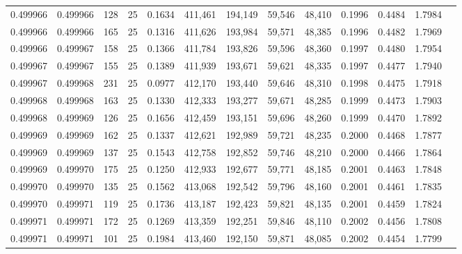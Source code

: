 \begin{tabular}{rrrrrrrrrrrrr}
0.499966 & 0.499966 & 128 &  25 &                                     0.1634 & 411,461 & 194,149 &  59,546 &  48,410 & 0.1996 & 0.4484 & 1.7984 \\
0.499966 & 0.499966 & 165 &  25 &                                     0.1316 & 411,626 & 193,984 &  59,571 &  48,385 & 0.1996 & 0.4482 & 1.7969 \\
0.499966 & 0.499967 & 158 &  25 &                                     0.1366 & 411,784 & 193,826 &  59,596 &  48,360 & 0.1997 & 0.4480 & 1.7954 \\
0.499967 & 0.499967 & 155 &  25 &                                     0.1389 & 411,939 & 193,671 &  59,621 &  48,335 & 0.1997 & 0.4477 & 1.7940 \\
0.499967 & 0.499968 & 231 &  25 &                                     0.0977 & 412,170 & 193,440 &  59,646 &  48,310 & 0.1998 & 0.4475 & 1.7918 \\
0.499968 & 0.499968 & 163 &  25 &                                     0.1330 & 412,333 & 193,277 &  59,671 &  48,285 & 0.1999 & 0.4473 & 1.7903 \\
0.499968 & 0.499969 & 126 &  25 &                                     0.1656 & 412,459 & 193,151 &  59,696 &  48,260 & 0.1999 & 0.4470 & 1.7892 \\
0.499969 & 0.499969 & 162 &  25 &                                     0.1337 & 412,621 & 192,989 &  59,721 &  48,235 & 0.2000 & 0.4468 & 1.7877 \\
0.499969 & 0.499969 & 137 &  25 &                                     0.1543 & 412,758 & 192,852 &  59,746 &  48,210 & 0.2000 & 0.4466 & 1.7864 \\
0.499969 & 0.499970 & 175 &  25 &                                     0.1250 & 412,933 & 192,677 &  59,771 &  48,185 & 0.2001 & 0.4463 & 1.7848 \\
0.499970 & 0.499970 & 135 &  25 &                                     0.1562 & 413,068 & 192,542 &  59,796 &  48,160 & 0.2001 & 0.4461 & 1.7835 \\
0.499970 & 0.499971 & 119 &  25 &                                     0.1736 & 413,187 & 192,423 &  59,821 &  48,135 & 0.2001 & 0.4459 & 1.7824 \\
0.499971 & 0.499971 & 172 &  25 &                                     0.1269 & 413,359 & 192,251 &  59,846 &  48,110 & 0.2002 & 0.4456 & 1.7808 \\
0.499971 & 0.499971 & 101 &  25 &                                     0.1984 & 413,460 & 192,150 &  59,871 &  48,085 & 0.2002 & 0.4454 & 1.7799 \\

\end{tabular}
